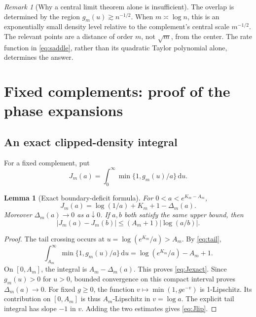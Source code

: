 \documentclass[11pt,a4paper]{article}
\numberwithin{equation}{section}
\newtheorem{lemma}[theorem]{Lemma}
\theoremstyle{definition}
\theoremstyle{remark}
\newtheorem{remark}[theorem]{Remark}
\newcommand{\dd}{\mathrm d}
\begin{document}
\begin{remark}[Why a central limit theorem alone is insufficient]
The overlap is determined by the region $g_m(u)\gtrsim n^{-1/2}$.
When $m\asymp\log n$, this is an exponentially small density level
relative to the complement's central scale $m^{-1/2}$. The relevant
points are a distance of order $m$, not $\sqrt m$, from the center.
The rate function in \eqref{eq:saddle}, rather than its quadratic
Taylor polynomial alone, determines the answer.
\end{remark}

\section{Fixed complements: proof of the phase expansions}
\label{sec:fixed}

\subsection{An exact clipped-density integral}
For a fixed complement, put
\[
J_m(a)=\int_0^\infty\min\{1,g_m(u)/a\}\,\dd u.
\]
\begin{lemma}[Exact boundary-deficit formula]\label{lem:J}
For $0<a<e^{K_m-A_m}$,
\begin{equation}\label{eq:Jexact}
J_m(a)=\log(1/a)+K_m+1-\Delta_m(a).
\end{equation}
Moreover $\Delta_m(a)\to0$ as $a\downarrow0$. If $a,b$ both satisfy the
same upper bound, then
\begin{equation}\label{eq:Jlip}
|J_m(a)-J_m(b)|\le(A_m+1)|\log(a/b)|.
\end{equation}
\end{lemma}
\begin{proof}
The tail crossing occurs at $u=\log(e^{K_m}/a)>A_m$. By
\eqref{eq:tail},
\[
\int_{A_m}^\infty\min\{1,g_m(u)/a\}\,\dd u
 =\log(e^{K_m}/a)-A_m+1.
\]
On $[0,A_m]$, the integral is $A_m-\Delta_m(a)$. This proves
\eqref{eq:Jexact}. Since $g_m(u)>0$ for $u>0$, bounded convergence on
this compact interval proves $\Delta_m(a)\to0$.
For fixed $g\ge0$, the function $v\mapsto\min(1,ge^{-v})$ is
1-Lipschitz. Its contribution on $[0,A_m]$ is thus $A_m$-Lipschitz
in $v=\log a$. The explicit tail integral has slope $-1$ in $v$.
Adding the two estimates gives \eqref{eq:Jlip}.
\end{proof}
\end{document}
